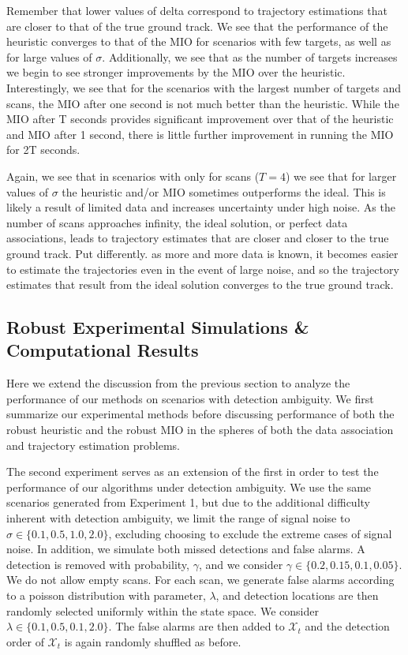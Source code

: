 \documentclass[journal]{IEEEtran}
\begin{document}
Remember that lower values of delta correspond to trajectory estimations that are closer to that of the true ground track. We see that the performance of the heuristic converges to that of the MIO for scenarios with few targets, as well as for large values of $\sigma$. Additionally, we see that as the number of targets increases we begin to see stronger improvements by the MIO over the heuristic. Interestingly, we see that for the scenarios with the largest number of targets and scans, the MIO after one second is not much better than the heuristic. While the MIO after T seconds provides significant improvement over that of the heuristic and MIO after 1 second, there is little further improvement in running the MIO for 2T seconds. 

Again, we see that in scenarios with only for scans ($T=4$) we see that for larger values of $\sigma$ the heuristic and/or MIO sometimes outperforms the ideal. This is likely a result of limited data and increases uncertainty under high noise. As the number of scans approaches infinity, the ideal solution, or perfect data associations, leads to trajectory estimates that are closer and closer to the true ground track. Put differently. as more and more data is known, it becomes easier to estimate the trajectories even in the event of large noise, and so the trajectory estimates that result from the ideal solution converges to the true ground track. 

\subsection{Robust Experimental Simulations \& Computational Results}\label{sec:Robust_Results}
Here we extend the discussion from the previous section to analyze the performance of our methods on scenarios with detection ambiguity. We first summarize our experimental methods before discussing performance of both the robust heuristic and the robust MIO in the spheres of both the data association and trajectory estimation problems.

The second experiment serves as an extension of the first in order to test the performance of our algorithms under detection ambiguity. We use the same scenarios generated from Experiment 1, but due to the additional difficulty inherent with detection ambiguity, we limit the range of signal noise to $\sigma \in \{0.1,0.5,1.0,2.0\}$, excluding choosing to exclude the extreme cases of signal noise. In addition, we simulate both missed detections and false alarms. A detection is removed with probability, $\gamma$, and we consider $\gamma \in \{0.2,0.15,0.1,0.05\}$. We do not allow empty scans. For each scan, we generate false alarms according to a poisson distribution with parameter, $\lambda$, and detection locations are then randomly selected uniformly within the state space. We consider $\lambda \in \{0.1,0.5,0.1,2.0\}$. The false alarms are then added to $\mathcal{X}_{t}$ and the detection order of $\mathcal{X}_{t}$ is again randomly shuffled as before. 
\end{document}
